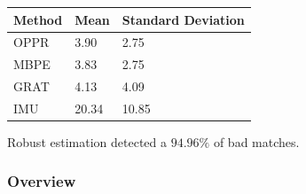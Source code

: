 \begin{table}
	\centering
\begin{tabular}{| l | l | l |}
	\hline
	Method & Mean & Standard Deviation \\
	\hline
	OPPR &  3.90 \degree & 2.75 \degree \\
	\hline
	MBPE &  3.83 \degree & 2.75 \degree \\
	\hline
	GRAT &  4.13 \degree & 4.09 \degree \\ 
	\hline
	IMU &  20.34 \degree & 10.85 \degree \\ 
	\hline
\end{tabular}
\label{cha5:sec1:r1anglet}
\end{table}

Robust estimation detected a $ 94.96 \%$ of bad matches.

\subsubsection{Overview}

